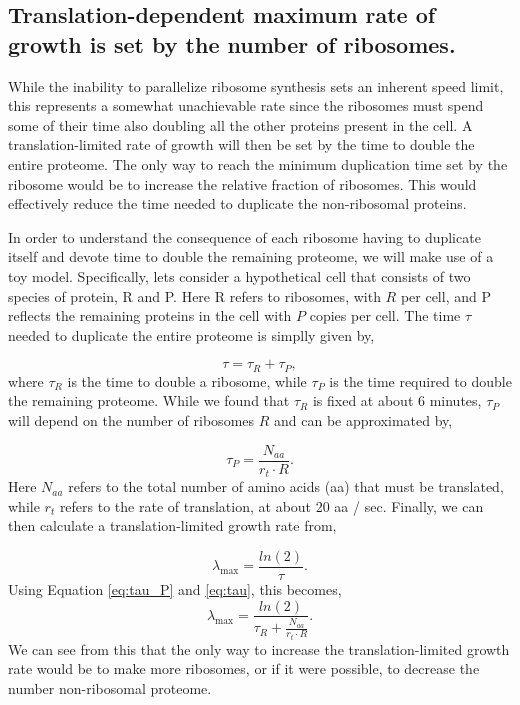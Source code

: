 \documentclass[11pt, letterpaper]{article}
\begin{document}
\subsection{Translation-dependent maximum rate of growth is set by the number of
ribosomes.}

While the inability to parallelize ribosome synthesis sets an inherent speed
limit, this represents a somewhat unachievable rate since the ribosomes must
spend some of their time also doubling all the other proteins present in the
cell. A translation-limited rate of growth will then be set by the time to
double the entire proteome. The only way to reach the minimum duplication time
set by the ribosome would be to increase the relative fraction of ribosomes.
This would effectively reduce the time needed to duplicate the non-ribosomal
proteins.

In order to understand the consequence of each ribosome having to duplicate
itself and devote time to double the remaining proteome, we will make use of a
toy model. Specifically, lets consider a hypothetical cell that consists of two
species of protein, R and P. Here R refers to ribosomes, with $R$ per cell, and
P reflects the remaining proteins in the cell with $P$ copies per cell. The time
$\tau$ needed to duplicate the entire proteome is simplly given by,

\begin{equation}
	\tau = \tau_R + \tau_P,
\label{eq:tau}
\end{equation}
where $\tau_R$ is the time to double a ribosome, while $\tau_P$ is the time
required to double the remaining proteome. While we found that $\tau_R$ is fixed
at about 6 minutes,  $\tau_P$  will depend on the number of ribosomes $R$ and
can be approximated by,

\begin{equation}
\tau_P = \frac{N_{aa}}{r_t \cdot R}.
\label{eq:tau_P}
\end{equation}
Here $N_{aa}$ refers to the total number of amino acids (aa) that must be translated,
while $r_t$ refers to the rate of translation, at about 20 aa /
sec. Finally, we can then calculate a translation-limited growth rate from,

\begin{equation}
\lambda_{\text{max}} =  \frac{ln(2)} {\tau}.
\end{equation}
Using Equation \ref{eq:tau_P} and \ref{eq:tau}, this becomes,
\begin{equation}
\lambda_{\text{max}} =  \frac{ln(2)} {\tau_R + \frac{N_{aa}}{r_t \cdot R}}.
\label{eq:lambda_max}
\end{equation}
 We can see from this that the only way to increase the translation-limited
growth rate would be to make more ribosomes, or if it were possible, to decrease the
number non-ribosomal proteome.
\end{document}
